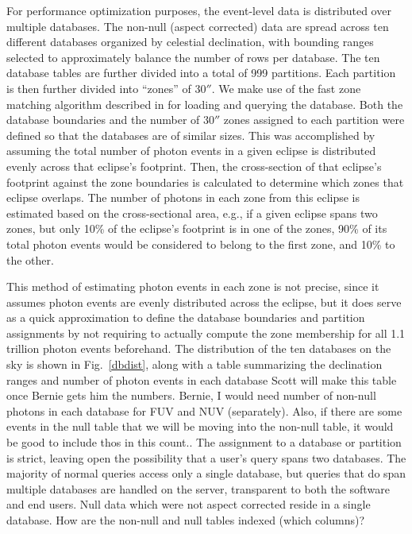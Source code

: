 \documentclass[5p]{elsarticle}
\begin{document}
For performance optimization purposes, the event-level data is distributed over multiple databases. The non-null (aspect corrected) data are spread across ten different databases organized by celestial declination, with bounding ranges selected to approximately balance the number of rows per database.  The ten database tables are further divided into a total of 999 partitions. Each partition is then further divided into ``zones'' of $30''$. We make use of the fast zone matching algorithm described in \citet{gra2006} for loading and querying the database.  Both the database boundaries and the number of $30''$ zones assigned to each partition were defined so that the databases are of similar sizes.  This was accomplished by assuming the total number of photon events in a given eclipse is distributed evenly across that eclipse's footprint.  Then, the cross-section of that eclipse's footprint against the zone boundaries is calculated to determine which zones that eclipse overlaps.  The number of photons in each zone from this eclipse is estimated based on the cross-sectional area, e.g., if a given eclipse spans two zones, but only 10\% of the eclipse's footprint is in one of the zones, 90\% of its total photon events would be considered to belong to the first zone, and 10\% to the other.

This method of estimating photon events in each zone is not precise, since it assumes photon events are evenly distributed across the eclipse, but it does serve as a quick approximation to define the database boundaries and partition assignments by not requiring to actually compute the zone membership for all 1.1 trillion photon events beforehand.  The distribution of the ten databases on the sky is shown in Fig.\ \ref{dbdist}, along with a table summarizing the declination ranges and number of photon events in each database {\color{red}Scott will make this table once Bernie gets him the numbers.  Bernie, I would need number of non-null photons in each database for FUV and NUV (separately).  Also, if there are some events in the null table that we will be moving into the non-null table, it would be good to include thos in this count.}. The assignment to a database or partition is strict, leaving open the possibility that a user's query spans two databases. The majority of normal queries access only a single database, but queries that do span multiple databases are handled on the server, transparent to both the software and end users. Null data which were not aspect corrected reside in a single database.  {\color{red}How are the non-null and null tables indexed (which columns)?}
\end{document}

